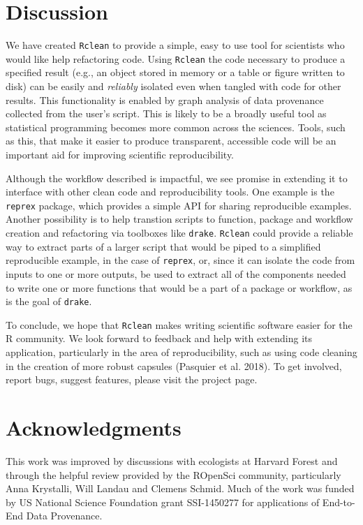 \documentclass[]{article}
\begin{document}
\section{Discussion}\label{discussion}

We have created \texttt{Rclean} to provide a simple, easy to use tool
for scientists who would like help refactoring code. Using
\texttt{Rclean} the code necessary to produce a specified result (e.g.,
an object stored in memory or a table or figure written to disk) can be
easily and \emph{reliably} isolated even when tangled with code for
other results. This functionality is enabled by graph analysis of data
provenance collected from the user's script. This is likely to be a
broadly useful tool as statistical programming becomes more common
across the sciences. Tools, such as this, that make it easier to produce
transparent, accessible code will be an important aid for improving
scientific reproducibility.

Although the workflow described is impactful, we see promise in
extending it to interface with other clean code and reproducibility
tools. One example is the \texttt{reprex} package, which provides a
simple API for sharing reproducible examples. Another possibility is to
help transtion scripts to function, package and workflow creation and
refactoring via toolboxes like \texttt{drake}. \texttt{Rclean} could
provide a reliable way to extract parts of a larger script that would be
piped to a simplified reproducible example, in the case of
\texttt{reprex}, or, since it can isolate the code from inputs to one or
more outputs, be used to extract all of the components needed to write
one or more functions that would be a part of a package or workflow, as
is the goal of \texttt{drake}.

To conclude, we hope that \texttt{Rclean} makes writing scientific
software easier for the R community. We look forward to feedback and
help with extending its application, particularly in the area of
reproducibility, such as using code cleaning in the creation of more
robust capsules (Pasquier et al. 2018). To get involved, report bugs,
suggest features, please visit the project page.

\section{Acknowledgments}\label{acknowledgments}

This work was improved by discussions with ecologists at Harvard Forest
and through the helpful review provided by the ROpenSci community,
particularly Anna Krystalli, Will Landau and Clemens Schmid. Much of the
work was funded by US National Science Foundation grant SSI-1450277 for
applications of End-to-End Data Provenance.
\end{document}
